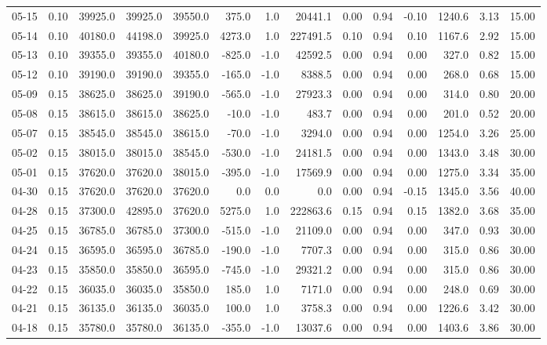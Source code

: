 \begin{threeparttable}
{\begin{tabular}{lrrrrrrrrrrrrr}
05-15 & 0.10 & 39925.0 & 39925.0 & 39550.0 & 375.0 & 1.0 & 20441.1 & 0.00 & 0.94 & -0.10 & 1240.6 & 3.13 & 15.00 \\
05-14 & 0.10 & 40180.0 & 44198.0 & 39925.0 & 4273.0 & 1.0 & 227491.5 & 0.10 & 0.94 & 0.10 & 1167.6 & 2.92 & 15.00 \\
05-13 & 0.10 & 39355.0 & 39355.0 & 40180.0 & -825.0 & -1.0 & 42592.5 & 0.00 & 0.94 & 0.00 & 327.0 & 0.82 & 15.00 \\
05-12 & 0.10 & 39190.0 & 39190.0 & 39355.0 & -165.0 & -1.0 & 8388.5 & 0.00 & 0.94 & 0.00 & 268.0 & 0.68 & 15.00 \\
05-09 & 0.15 & 38625.0 & 38625.0 & 39190.0 & -565.0 & -1.0 & 27923.3 & 0.00 & 0.94 & 0.00 & 314.0 & 0.80 & 20.00 \\
05-08 & 0.15 & 38615.0 & 38615.0 & 38625.0 & -10.0 & -1.0 & 483.7 & 0.00 & 0.94 & 0.00 & 201.0 & 0.52 & 20.00 \\
05-07 & 0.15 & 38545.0 & 38545.0 & 38615.0 & -70.0 & -1.0 & 3294.0 & 0.00 & 0.94 & 0.00 & 1254.0 & 3.26 & 25.00 \\
05-02 & 0.15 & 38015.0 & 38015.0 & 38545.0 & -530.0 & -1.0 & 24181.5 & 0.00 & 0.94 & 0.00 & 1343.0 & 3.48 & 30.00 \\
05-01 & 0.15 & 37620.0 & 37620.0 & 38015.0 & -395.0 & -1.0 & 17569.9 & 0.00 & 0.94 & 0.00 & 1275.0 & 3.34 & 35.00 \\
04-30 & 0.15 & 37620.0 & 37620.0 & 37620.0 & 0.0 & 0.0 & 0.0 & 0.00 & 0.94 & -0.15 & 1345.0 & 3.56 & 40.00 \\
04-28 & 0.15 & 37300.0 & 42895.0 & 37620.0 & 5275.0 & 1.0 & 222863.6 & 0.15 & 0.94 & 0.15 & 1382.0 & 3.68 & 35.00 \\
04-25 & 0.15 & 36785.0 & 36785.0 & 37300.0 & -515.0 & -1.0 & 21109.0 & 0.00 & 0.94 & 0.00 & 347.0 & 0.93 & 30.00 \\
04-24 & 0.15 & 36595.0 & 36595.0 & 36785.0 & -190.0 & -1.0 & 7707.3 & 0.00 & 0.94 & 0.00 & 315.0 & 0.86 & 30.00 \\
04-23 & 0.15 & 35850.0 & 35850.0 & 36595.0 & -745.0 & -1.0 & 29321.2 & 0.00 & 0.94 & 0.00 & 315.0 & 0.86 & 30.00 \\
04-22 & 0.15 & 36035.0 & 36035.0 & 35850.0 & 185.0 & 1.0 & 7171.0 & 0.00 & 0.94 & 0.00 & 248.0 & 0.69 & 30.00 \\
04-21 & 0.15 & 36135.0 & 36135.0 & 36035.0 & 100.0 & 1.0 & 3758.3 & 0.00 & 0.94 & 0.00 & 1226.6 & 3.42 & 30.00 \\
04-18 & 0.15 & 35780.0 & 35780.0 & 36135.0 & -355.0 & -1.0 & 13037.6 & 0.00 & 0.94 & 0.00 & 1403.6 & 3.86 & 30.00 \\

\end{tabular}}
\end{threeparttable}
